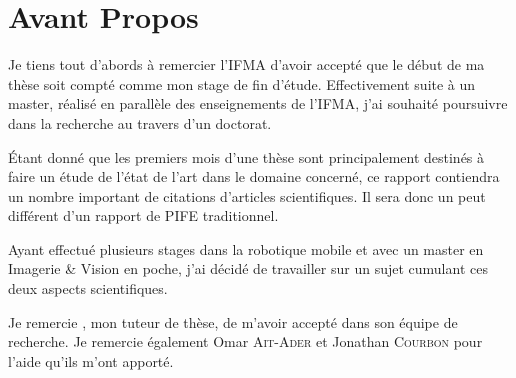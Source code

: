 \section*{Avant Propos}

Je tiens tout d'abords à remercier l'IFMA d'avoir accepté que le début de ma thèse soit compté comme mon stage de fin d'étude.
Effectivement suite à un master, réalisé en parallèle des enseignements de l'IFMA, j'ai souhaité poursuivre dans la recherche au travers d'un doctorat.

\'Etant donné que les premiers mois d'une thèse sont principalement destinés à faire un étude de l'état de l'art dans le domaine concerné, ce rapport contiendra un nombre important de citations d'articles scientifiques. Il sera donc un peut différent d'un rapport de PIFE traditionnel.

Ayant effectué plusieurs stages dans la robotique mobile et avec un master en Imagerie \& Vision en poche, j'ai décidé de travailler sur un sujet cumulant ces deux aspects scientifiques.

Je remercie \tuteur, mon tuteur de thèse, de m'avoir accepté dans son équipe de recherche. Je remercie également Omar \textsc{Ait-Ader} et Jonathan \textsc{Courbon} pour l'aide qu'ils m'ont apporté.